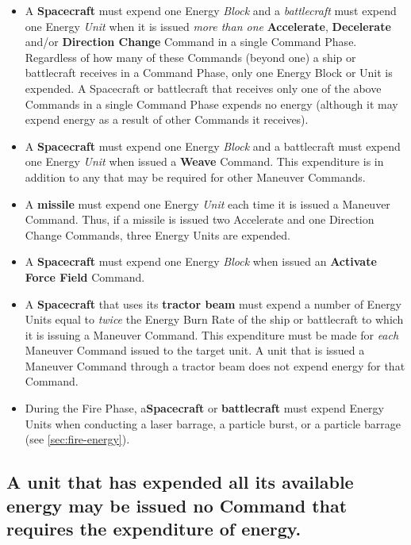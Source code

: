 \begin{itemize}
\item A \textbf{Spacecraft} must expend one Energy \emph{Block} and a
  \emph{battlecraft} must expend one Energy \emph{Unit} when it is
  issued \emph{more than one} \textbf{Accelerate}, \textbf{Decelerate}
  and/or \textbf{Direction Change} Command in a single Command Phase.
  Regardless of how many of these Commands (beyond one) a ship or
  battlecraft receives in a Command Phase, only one Energy Block or
  Unit is expended. A Spacecraft or battlecraft that receives only one
  of the above Commands in a single Command Phase expends no energy
  (although it may expend energy as a result of other Commands it
  receives).
\item A \textbf{Spacecraft} must expend one Energy \emph{Block} and a
  battlecraft must expend one Energy \emph{Unit} when issued a
  \textbf{Weave} Command. This expenditure is in addition to any that
  may be required for other Maneuver Commands.
\item A \textbf{missile} must expend one Energy \emph{Unit} each time
  it is issued a Maneuver Command. Thus, if a missile is issued two
  Accelerate and one Direction Change Commands, three Energy Units are
  expended.
\item A \textbf{Spacecraft} must expend one Energy \emph{Block} when
  issued an \textbf{Activate Force Field} Command.
\item A \textbf{Spacecraft} that uses its \textbf{tractor beam} must
  expend a number of Energy Units equal to\emph{ twice} the Energy
  Burn Rate of the ship or battlecraft to which it is issuing a
  Maneuver Command. This expenditure must be made for \emph{each}
  Maneuver Command issued to the target unit. A unit that is issued a
  Maneuver Command through a tractor beam does not expend energy for
  that Command.
\item During the Fire Phase, a\textbf{Spacecraft} or
  \textbf{battlecraft} must expend Energy Units when conducting a
  laser barrage, a particle burst, or a particle barrage (see
  \ref{sec:fire-energy}).
\end{itemize}

\subsection[No Energy Left]{A unit that has expended all its available
  energy may be issued no Command that requires the expenditure  
  of energy.}
\label{sec:zero-energy}

